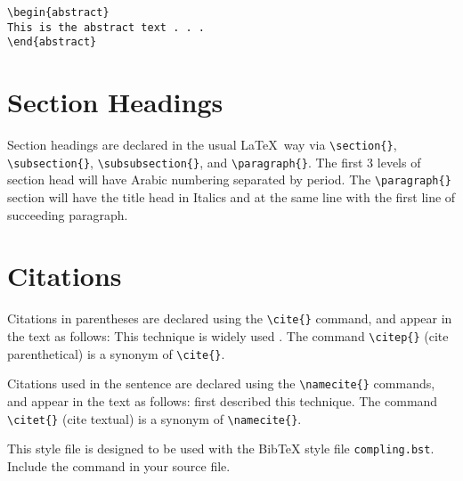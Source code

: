 \documentclass[manuscript]{clv3}
\begin{document}
\begin{verbatim}
\begin{abstract}
This is the abstract text . . .
\end{abstract}
\end{verbatim}

\section{Section Headings}

Section headings are declared in the usual \LaTeX\ way via \verb|\section{}|, 
\verb|\subsection{}|, \verb|\subsubsection{}|, and \verb|\paragraph{}|. The 
first 3 levels of section head will have Arabic numbering separated 
by period. The \verb|\paragraph{}| section will have the title head in Italics 
and at the same line with the first line of succeeding paragraph.

\section{Citations}
Citations in parentheses are declared using the \verb|\cite{}|
command, and appear in the text as follows: 
This technique is widely used \cite{woods}.
The command \verb|\citep{}| (cite parenthetical) is a synonym of \verb|\cite{}|.

Citations used in the sentence are declared using the \verb|\namecite{}|
commands, and appear in the text as follows: 
 first described this technique.
The command \verb|\citet{}| (cite textual) is a synonym of \verb|\namecite{}|.

This style file is designed to be used with the BibTeX
style file \verb|compling.bst|.  Include the command
\verb|| in your source file.
\end{document}
